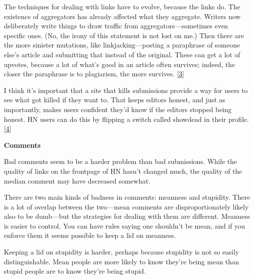 The techniques
                  for dealing with links have to evolve, because the links do.
                  The existence of aggregators has already affected what they
                  aggregate. Writers now deliberately write things to draw
                  traffic from aggregators---sometimes even specific ones.
                  (No, the irony of this statement is not lost on me.) Then
                  there are the more sinister mutations, like
                  linkjacking---posting a paraphrase of someone else's
                  article and submitting that instead of the original. These can
                  get a lot of upvotes, because a lot of what's good in an
                  article often survives; indeed, the closer the paraphrase is
                  to plagiarism, the more survives.
                  [\href{\#f3n}{3}]

I think it's important that a site that kills
                  submissions provide a way for users to see what got killed if
                  they want to. That keeps editors honest, and just as
                  importantly, makes users confident they'd know if the editors
                  stopped being honest. HN users can do this by flipping a
                  switch called showdead in their profile.
                  [\href{\#f4n}{4}]

\textbf{Comments}

Bad comments seem to
                  be a harder problem than bad submissions. While the quality of
                  links on the frontpage of HN hasn't changed much, the quality
                  of the median comment may have decreased somewhat.

There
                  are two main kinds of badness in comments: meanness and
                  stupidity. There is a lot of overlap between the
                  two---mean comments are disproportionately likely also to
                  be dumb---but the strategies for dealing with them are
                  different. Meanness is easier to control. You can have rules
                  saying one shouldn't be mean, and if you enforce them it seems
                  possible to keep a lid on meanness.

Keeping a lid
                  on stupidity is harder, perhaps because stupidity is not so
                  easily distinguishable. Mean people are more likely to know
                  they're being mean than stupid people are to know they're
                  being stupid.

